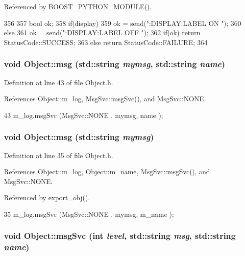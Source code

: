 Referenced by BOOST\_\-PYTHON\_\-MODULE().


\begin{DoxyCode}
356 {
357     bool ok;
358     if(display)     
359         ok = send(":DISPLAY:LABEL ON \n");
360     else
361         ok = send(":DISPLAY:LABEL OFF \n");
362     if(ok)  return StatusCode::SUCCESS;
363     else        return StatusCode::FAILURE; 
364 }
\end{DoxyCode}
\hypertarget{classObject_ac5d59299273cee27aacf7de00d2e7034}{
\subsubsection[{msg}]{\setlength{\rightskip}{0pt plus 5cm}void Object::msg (std::string {\em mymsg}, \/  std::string {\em name})}}
\label{classObject_ac5d59299273cee27aacf7de00d2e7034}


Definition at line 43 of file Object.h.

References Object::m\_\-log, MsgSvc::msgSvc(), and MsgSvc::NONE.


\begin{DoxyCode}
43 { m_log.msgSvc (MsgSvc::NONE    , mymsg, name ); }
\end{DoxyCode}
\hypertarget{classObject_a58b2d0618c2d08cf2383012611528d97}{
\subsubsection[{msg}]{\setlength{\rightskip}{0pt plus 5cm}void Object::msg (std::string {\em mymsg})}}
\label{classObject_a58b2d0618c2d08cf2383012611528d97}


Definition at line 35 of file Object.h.

References Object::m\_\-log, Object::m\_\-name, MsgSvc::msgSvc(), and MsgSvc::NONE.

Referenced by export\_\-obj().


\begin{DoxyCode}
35 { m_log.msgSvc (MsgSvc::NONE    , mymsg, m_name ); }
\end{DoxyCode}
\hypertarget{classObject_a3f9d5537ebce0c0f2bf6ae4d92426f3c}{
\subsubsection[{msgSvc}]{\setlength{\rightskip}{0pt plus 5cm}void Object::msgSvc (int {\em level}, \/  std::string {\em msg}, \/  std::string {\em name})}}
\label{classObject_a3f9d5537ebce0c0f2bf6ae4d92426f3c}


